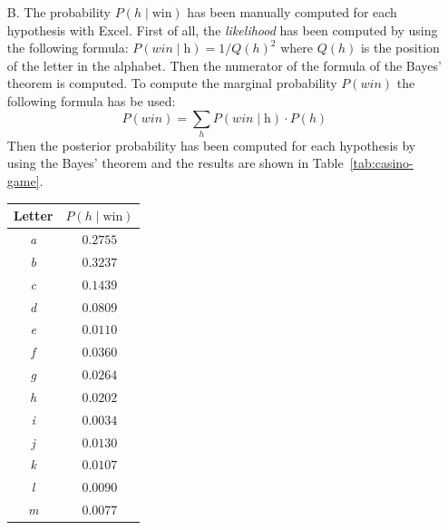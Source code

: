 \begin{itemize}
    \item[B.] The probability $P(h\;|\;\text{win})$ has been manually computed for each hypothesis with Excel. First of all, the
        \textit{likelihood} has been computed by using the following formula: $P(win\;|\;\text{h}) = 1/Q(h)^{2}$ where $Q(h)$ is
        the position of the letter in the alphabet. Then the numerator of the formula of the Bayes' theorem is computed.
        To compute the marginal probability $P(win)$ the following formula has be used:
        \[ P(win) = \sum_{h} P(win\;|\;\text{h}) \cdot P(h)\]
        Then the posterior probability has been computed for each hypothesis by using the Bayes' theorem and the results are shown
        in Table~\ref{tab:casino-game}.
        \begin{table}[H]
            \centering
            \begin{minipage}{.4\linewidth}
                \centering
                \begin{tabular}{c c}
                    \hline
                    \textbf{Letter} & $P(h\;|\;\text{win})$ \\
                    \hline
                    \textit{a} & $0.2755$ \\
                    \textit{b} & $0.3237$ \\
                    \textit{c} & $0.1439$ \\
                    \textit{d} & $0.0809$ \\
                    \textit{e} & $0.0110$ \\
                    \textit{f} & $0.0360$ \\
                    \textit{g} & $0.0264$ \\
                    \textit{h} & $0.0202$ \\
                    \textit{i} & $0.0034$ \\
                    \textit{j} & $0.0130$ \\
                    \textit{k} & $0.0107$ \\
                    \textit{l} & $0.0090$ \\
                    \textit{m} & $0.0077$ \\
                    \hline
                \end{tabular}
            \end{minipage}
            \begin{minipage}{.4\linewidth}
                \centering
                \begin{tabular}{c c}

\end{tabular}
\end{minipage}
\end{table}
\end{itemize}
